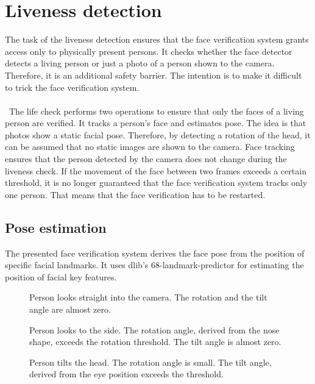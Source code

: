 \documentclass[%
a4paper,
twoside,
openany,
dvipsnames
]
{report}
\let\svfigure\figure
\let\svendfigure\endfigure
\renewenvironment{figure}[1][tb]{\svfigure[#1]\setstretch{1}}
{\svendfigure}
\begin{document}
\section{Liveness detection} 
The task of the liveness detection ensures that the face verification system grants access only to physically present persons. It checks whether the face detector detects a living person or just a photo of a person shown to the camera. Therefore, it is an additional safety barrier. The intention is to make it difficult to trick the face verification system. \\
\\\
The life check performs two operations to ensure that only the faces of a living person are verified. It tracks a person's face and estimates pose. The idea is that photos show a static facial pose. Therefore, by detecting a rotation of the head, it can be assumed that no static images are shown to the camera. Face tracking ensures that the person detected by the camera does not change during the liveness check. If the movement of the face between two frames exceeds a certain threshold, it is no longer guaranteed that the face verification system tracks only one person. That means that the face verification has to be restarted.

\subsection{Pose estimation}
The presented face verification system derives the face pose from the position of specific facial landmarks. It uses dlib's 68-landmark-predictor for estimating the position of facial key features.
\begin{figure}[h!]
	\centering
	\begin{subfigure}[c]{0.49\textwidth}
		
		\caption{Person looks straight into the camera. The rotation and the tilt angle are almost zero.}
		\label{subfig:facePoseStraight}
	\end{subfigure}%
	\hfill
	\begin{subfigure}[c]{0.49\textwidth}
		
		\caption{Person looks to the side. The rotation angle, derived from the nose shape, exceeds the rotation threshold. The tilt angle is almost zero.}
		\label{subfig:facePoseLeft}
	\end{subfigure}%
	\hfill
	\begin{subfigure}[c]{0.49\textwidth}
		
		\caption{Person tilts the head. The rotation angle is small. The tilt angle, derived from the eye position exceeds the threshold.}
		\label{subfig:facePoseTilt}
	\end{subfigure}%
	\caption[Pose estimation using 68 landmarks.]{Pose estimation using 68 landmarks. The rotation of the face is derived from the nose shape by computing the angle between vector N$_0$ and N$_1$ (). The tilt angle is derived from the angle between the vector connecting the outer eye positions and the Y-axis ().} 
	\label{fig:facePose}
\end{figure} 
\end{document}
